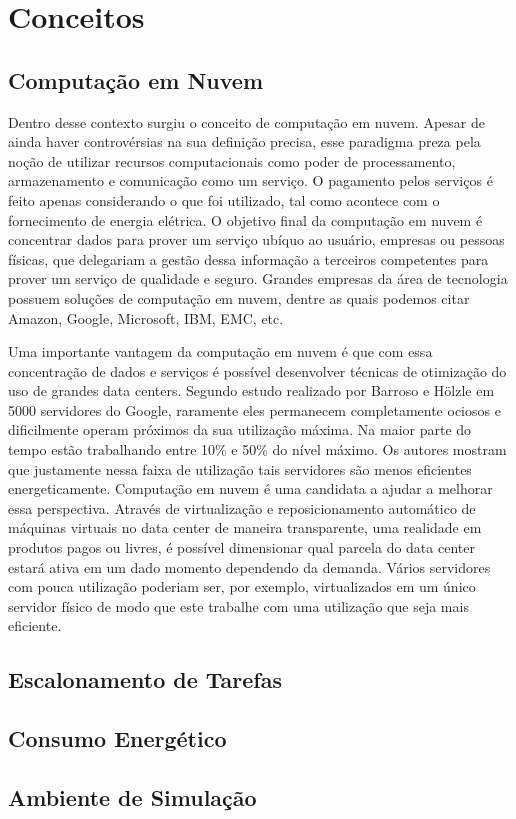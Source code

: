 \chapter{Conceitos}
\label{cap:conceitos}

\section{Computação em Nuvem}
\label{sec:computacao_nuvem}
Dentro desse contexto surgiu o conceito de computação em nuvem. Apesar de ainda haver controvérsias na sua definição precisa, esse paradigma preza pela noção de utilizar recursos computacionais como poder de processamento, armazenamento e comunicação como um serviço. O pagamento pelos serviços é feito apenas considerando o que foi utilizado, tal como acontece com o fornecimento de energia elétrica. O objetivo final da computação em nuvem é concentrar dados para prover um serviço ubíquo ao usuário, empresas ou pessoas físicas, que delegariam a gestão dessa informação a terceiros competentes para prover um serviço de qualidade e seguro. Grandes empresas da área de tecnologia possuem soluções de computação em nuvem, dentre as quais podemos citar Amazon, Google, Microsoft, IBM, EMC, etc.

Uma importante vantagem da computação em nuvem é que com essa concentração de dados e serviços é possível desenvolver técnicas de otimização do uso de grandes data centers. Segundo estudo realizado por Barroso e Hölzle \cite{barroso:case_energy_proportional} em 5000 servidores do Google, raramente eles permanecem completamente ociosos e dificilmente operam próximos da sua utilização máxima. Na maior parte do tempo estão trabalhando entre 10\% e 50\% do nível máximo. Os autores mostram que justamente nessa faixa de utilização tais servidores são menos eficientes energeticamente. Computação em nuvem é uma candidata a ajudar a melhorar essa perspectiva. Através de virtualização e reposicionamento automático de máquinas virtuais no data center de maneira transparente, uma realidade em produtos pagos ou livres, é possível dimensionar qual parcela do data center estará ativa em um dado momento dependendo da demanda. Vários servidores com pouca utilização poderiam ser, por exemplo, virtualizados em um único servidor físico de modo que este trabalhe com uma utilização que seja mais eficiente.


\section{Escalonamento de Tarefas}
\label{sec:escalonamento_tarefas}

\section{Consumo Energético}
\label{sec:consumo_energetico}


\section{Ambiente de Simulação}
\label{sec:ambiente_simulacao}


